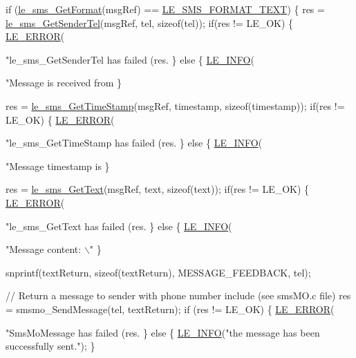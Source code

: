 \begin{DoxyCodeInclude}
{{    \textcolor{keywordflow}{if} (\hyperlink{le__sms__interface_8h_a5c2b8ce7043b4732c7b0ede7c5d7118c}{le\_sms\_GetFormat}(msgRef) == \hyperlink{le__sms__interface_8h_a337778c44e63660c44fa2116699296c0a1bb6a0d76a622b1185ee879e1595dff8}{LE\_SMS\_FORMAT\_TEXT})
    \{
        res = \hyperlink{le__sms__interface_8h_aa4651e8dc97aa01df80ed6d9a7a486c6}{le\_sms\_GetSenderTel}(msgRef, tel, \textcolor{keyword}{sizeof}(tel));
        \textcolor{keywordflow}{if}(res != LE\_OK)
        \{
            \hyperlink{le__log_8h_a353590f91b3143a7ba3a416ae5a50c3d}{LE\_ERROR}(\textcolor{stringliteral}{"le\_sms\_GetSenderTel has failed (res.%
        \}
        \textcolor{keywordflow}{else}
        \{
            \hyperlink{le__log_8h_a23e6d206faa64f612045d688cdde5808}{LE\_INFO}(\textcolor{stringliteral}{"Message is received from %
        \}

        res = \hyperlink{le__sms__interface_8h_af018ca1bc2085a48e4b6d4691bef3cc7}{le\_sms\_GetTimeStamp}(msgRef, timestamp, \textcolor{keyword}{sizeof}(timestamp));
        \textcolor{keywordflow}{if}(res != LE\_OK)
        \{
            \hyperlink{le__log_8h_a353590f91b3143a7ba3a416ae5a50c3d}{LE\_ERROR}(\textcolor{stringliteral}{"le\_sms\_GetTimeStamp has failed (res.%
        \}
        \textcolor{keywordflow}{else}
        \{
            \hyperlink{le__log_8h_a23e6d206faa64f612045d688cdde5808}{LE\_INFO}(\textcolor{stringliteral}{"Message timestamp is %
        \}

        res = \hyperlink{le__sms__interface_8h_aebf0c28efce6ec0b9616ffa8ecb80782}{le\_sms\_GetText}(msgRef, text, \textcolor{keyword}{sizeof}(text));
        \textcolor{keywordflow}{if}(res != LE\_OK)
        \{
            \hyperlink{le__log_8h_a353590f91b3143a7ba3a416ae5a50c3d}{LE\_ERROR}(\textcolor{stringliteral}{"le\_sms\_GetText has failed (res.%
        \}
        \textcolor{keywordflow}{else}
        \{
            \hyperlink{le__log_8h_a23e6d206faa64f612045d688cdde5808}{LE\_INFO}(\textcolor{stringliteral}{"Message content: \(\backslash\)"%
        \}

        snprintf(textReturn, \textcolor{keyword}{sizeof}(textReturn), MESSAGE\_FEEDBACK, tel);

        \textcolor{comment}{// Return a message to sender with phone number include (see smsMO.c file)}
        res = smsmo\_SendMessage(tel, textReturn);
        \textcolor{keywordflow}{if} (res != LE\_OK)
        \{
            \hyperlink{le__log_8h_a353590f91b3143a7ba3a416ae5a50c3d}{LE\_ERROR}(\textcolor{stringliteral}{"SmsMoMessage has failed (res.%
        \}
        \textcolor{keywordflow}{else}
        \{
            \hyperlink{le__log_8h_a23e6d206faa64f612045d688cdde5808}{LE\_INFO}(\textcolor{stringliteral}{"the message has been successfully sent."});
        \}

}}}}}}}}}
\end{DoxyCodeInclude}
